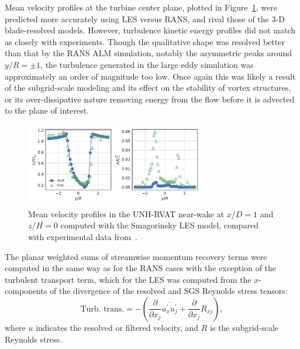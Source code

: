 \documentclass[times]{weauth}
\begin{document}
Mean velocity profiles at the turbine center plane, plotted in
Figure~\ref{fig:RVAT-ALM-LES-profiles}, were predicted more accurately using LES
versus RANS, and rival those of the 3-D blade-resolved models. However,
turbulence kinetic energy profiles did not match as closely with experiments.
Though the qualitative shape was resolved better than that by the RANS ALM
simulation, notably the asymmetric peaks around $y/R = \pm 1$, the turbulence
generated in the large eddy simulation was approximately an order of magnitude
too low. Once again this was likely a result of the subgrid-scale modeling and
its effect on the stability of vortex structures, or its over-dissipative nature
removing energy from the flow before it is advected to the plane of interest.

\begin{figure}
    \centering

    \includegraphics[width=0.7\textwidth]{RVAT-ALM-LES_wake-profiles}

    \caption{Mean velocity profiles in the UNH-RVAT near-wake at $x/D=1$ and
        $z/H=0$ computed with the Smagorinsky LES model, compared with experimental
        data from~\cite{Bachant2016-RVAT-Re-dep}.}

    \label{fig:RVAT-ALM-LES-profiles}
\end{figure}

The planar weighted sums of streamwise momentum recovery terms were computed in
the same way as for the RANS cases with the exception of the turbulent transport
term, which for the LES was computed from the $x$-components of the divergence
of the resolved and SGS Reynolds stress tensors:
\begin{equation}
    \text{Turb. trans.} = - \left( \frac{\partial}{\partial x_j}
    \overline{u^\prime_x u^\prime_j}
    + \frac{\partial}{\partial x_j} R_{xj}
    \right),
\end{equation}
where $u$ indicates the resolved or filtered velocity, and $R$ is the
subgrid-scale Reynolds stress.
\end{document}

